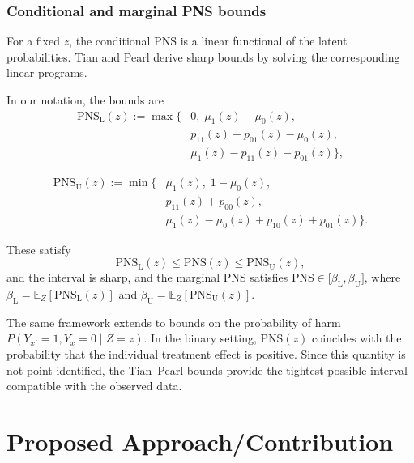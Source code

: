 \documentclass[accepted]{uai2026} %
\theoremstyle{plain}
\theoremstyle{definition}
\theoremstyle{remark}
\begin{document}
\subsubsection{Conditional and marginal PNS bounds}
\label{subsec:pns-bounds}

For a fixed $z$, the conditional PNS is a linear functional of the
latent probabilities. Tian and Pearl derive sharp bounds by solving the
corresponding linear programs.

In our notation, the bounds are
\begin{equation}
\begin{aligned}
\mathrm{PNS}_{\mathrm{L}}(z)
:= \max\Big\{&
0,\;
\mu_1(z) - \mu_0(z), \\
& p_{11}(z) + p_{01}(z) - \mu_0(z), \\
& \mu_1(z) - p_{11}(z) - p_{01}(z)
\Big\},
\end{aligned}
\label{eq:pns-lower-1}
\end{equation}

\begin{equation}
\begin{aligned}
\mathrm{PNS}_{\mathrm{U}}(z)
:= \min\Big\{&
\mu_1(z),\;
1 - \mu_0(z), \\
& p_{11}(z) + p_{00}(z), \\
& \mu_1(z) - \mu_0(z)
  + p_{10}(z) + p_{01}(z)
\Big\}.
\end{aligned}
\label{eq:pns-upper-1}
\end{equation}

These satisfy
\begin{equation}
\mathrm{PNS}_{\mathrm{L}}(z)
\le \mathrm{PNS}(z)
\le \mathrm{PNS}_{\mathrm{U}}(z),
\end{equation}
and the interval is sharp, and
the marginal PNS satisfies
$\mathrm{PNS}
\in \big[\beta_{\mathrm{L}}, 
\beta_{\mathrm{U}}\big]$,
where $\beta_{\mathrm{L}} = \mathbb{E}_{Z}[\mathrm{PNS}_{\mathrm{L}}(z)]$ and $\beta_{\mathrm{U}} = \mathbb{E}_{Z}[\mathrm{PNS}_{\mathrm{U}}(z)]$.

The same framework extends to bounds on the probability of harm
$P(Y_{x'} = 1, Y_x = 0 \mid Z = z)$.
In the binary setting, $\mathrm{PNS}(z)$ coincides with the probability
that the individual treatment effect is positive.
Since this quantity is not point-identified, the Tian--Pearl bounds
provide the tightest possible interval compatible with the observed
data.

\section{Proposed Approach/Contribution}
\end{document}
